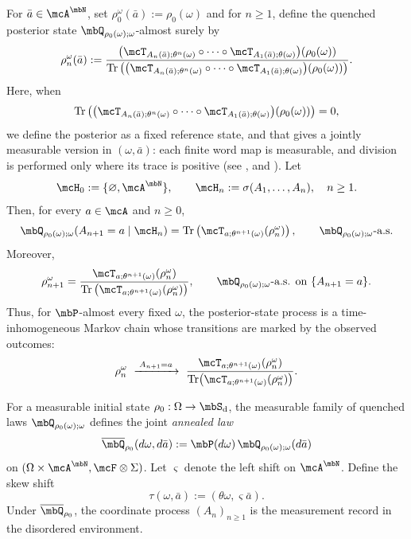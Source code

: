 \documentclass[a4paper]{article}
\numberwithin{equation}{section}   %
\theoremstyle{plain}   %
\theoremstyle{plain}   %
\theoremstyle{examplestyle}
\DeclareMathOperator{\states}{\mbS_d}   %
\DeclareMathOperator{\pr}{\mbP}           %
\renewcommand{\tr}[1]{\operatorname{Tr}\left(#1\right)} %
\begin{document}
    For $\bar  a \in \mcA^\mbN$, set \(\rho_0^\omega(\bar a):=\rho_0(\omega)\) and for \(n\ge1\), define the quenched posterior state \(\mbQ_{\rho_0(\omega);\omega}\)-almost surely by
    \[
        \rho_n^\omega(\bar a)
        :=
        \frac{
            \left(
                \mcT_{A_n(\bar a);\theta^n(\omega)}
                \circ\cdots\circ
                \mcT_{A_1(\bar a);\theta(\omega)}
            \right)\!\left(\rho_0(\omega)\right)
        }{
            \tr{
                \left(
                    \mcT_{A_n(\bar a);\theta^n(\omega)}
                    \circ\cdots\circ
                    \mcT_{A_1(\bar a);\theta(\omega)}
                \right)\!\left(\rho_0(\omega)\right)
            }
        }.
    \]
    Here, when 
    \[
        \tr{
                \left(
                    \mcT_{A_n(\bar a);\theta^n(\omega)}
                    \circ\cdots\circ
                    \mcT_{A_1(\bar a);\theta(\omega)}
                \right)\!\left(\rho_0(\omega)\right)
            }
            =0,
    \]
    we define the posterior as a fixed reference state, and that gives a jointly measurable version in $(\omega,\bar a)$: each finite word map is measurable, and division is performed only where its trace is positive (see ,  and ).
    Let
    \[
        \mcH_0:=\{\varnothing,\mcA^\mbN\},
        \qquad
        \mcH_n:=\sigma(A_1,\ldots,A_n),
        \quad n\ge1.
    \]
    Then, for every \(a\in\mcA\) and \(n\ge0\),
    \[
        \mbQ_{\rho_0(\omega);\omega}
        (A_{n+1}=a\mid\mcH_n)
        =
        \tr{\mcT_{a;\theta^{n+1}(\omega)}(\rho_n^\omega)},
        \qquad
        \mbQ_{\rho_0(\omega);\omega}\text{-a.s.}
    \]
    Moreover,
    \[
        \rho_{n+1}^\omega
        =
        \frac{
            \mcT_{a;\theta^{n+1}(\omega)}(\rho_n^\omega)
        }{
            \tr{\mcT_{a;\theta^{n+1}(\omega)}(\rho_n^\omega)}
        },
        \qquad
        \mbQ_{\rho_0(\omega);\omega}\text{-a.s. on }\{A_{n+1}=a\}.
    \]
    Thus, for $\mbP$-almost every fixed \(\omega\), the posterior-state process is a time-inhomogeneous Markov chain whose transitions are marked by the observed outcomes:
    \[
        \rho_n^\omega
        \ \xrightarrow{\;A_{n+1}=a\;}\
        \frac{\mcT_{a;\theta^{n+1}(\omega)}(\rho_n^\omega)}
        {\operatorname{Tr}\!\left(
        \mcT_{a;\theta^{n+1}(\omega)}(\rho_n^\omega)
        \right)}.
    \]

    For a measurable initial state \(\rho_0:\Omega\to\states\), the measurable family of quenched laws \(\mbQ_{\rho_0(\omega);\omega}\)  defines the joint \emph{annealed law}
    \begin{equation}
    \label{eq:annealed}
        \overline{\mbQ}_{\rho_0}(d\omega,d\bar a)
        :=
        \pr(d\omega)\,
        \mbQ_{\rho_0(\omega);\omega}(d\bar a)
    \end{equation}
    on \((\Omega\times\mcA^\mbN,\mcF\otimes\Sigma)\).
    Let \(\varsigma\) denote the left shift on \(\mcA^\mbN\).
    Define the skew shift
    \[
        \tau(\omega,\bar a):=(\theta\omega,\varsigma\bar a).
    \]
    Under \(\overline{\mbQ}_{\rho_0}\), the coordinate process \((A_n)_{n\ge1}\) is the measurement record in the disordered environment.
\end{document}
